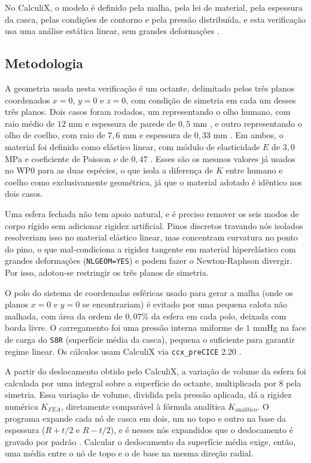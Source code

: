 No CalculiX, o modelo é definido pela malha, pela lei de material, pela espessura da casca, pelas condições de contorno e pela pressão distribuída, e esta verificação usa uma análise estática linear, sem grandes deformações \citep{dhondt2022manual}.
 
\subsection{Metodologia}
 
A geometria usada nesta verificação é um octante, delimitado pelos três planos coordenados $x=0$, $y=0$ e $z=0$, com condição de simetria em cada um desses três planos. Dois casos foram rodados, um representando o olho humano, com raio médio de $12$ mm \citep{moosajee2023} e espessura de parede de $0{,}5$ mm \citep{vurgese2012}, e outro representando o olho de coelho, com raio de $7{,}6$ mm \citep{bozkir1997, missel2012, lamminsalo2018} e espessura de $0{,}33$ mm \citep{missel2012, zhang2014cxl, lamminsalo2018}. Em ambos, o material foi definido como elástico linear, com módulo de elasticidade $E$ de $3{,}0$ MPa e coeficiente de Poisson $\nu$ de $0{,}47$ \citep{aloy2017vibrational}. Esses são os mesmos valores já usados no WP0 para as duas espécies, o que isola a diferença de $K$ entre humano e coelho como exclusivamente geométrica, já que o material adotado é idêntico nos dois casos.
 
Uma esfera fechada não tem apoio natural, e é preciso remover os seis modos de corpo rígido sem adicionar rigidez artificial. Pinos discretos travando nós isolados resolveriam isso no material elástico linear, mas concentram curvatura no ponto do pino, o que mal-condiciona a rigidez tangente em material hiperelástico com grandes deformações (\texttt{NLGEOM=YES}) e podem fazer o Newton-Raphson divergir. Por isso, adotou-se restringir os três planos de simetria.
 
O polo do sistema de coordenadas esféricas usado para gerar a malha (onde os planos $x=0$ e $y=0$ se encontrariam) é evitado por uma pequena calota não malhada, com área da ordem de $0{,}07\%$ da esfera em cada polo, deixada com borda livre. O carregamento foi uma pressão interna uniforme de $1$ mmHg na face de carga do \texttt{S8R} (superfície média da casca), pequena o suficiente para garantir regime linear. Os cálculos usam CalculiX \citep{dhondt2004finite} via \texttt{ccx\_preCICE} 2.20 \citep{dhondt2022manual}.
 
A partir do deslocamento obtido pelo CalculiX, a variação de volume da esfera foi calculada por uma integral sobre a superfície do octante, multiplicada por $8$ pela simetria. Essa variação de volume, dividida pela pressão aplicada, dá a rigidez numérica $K_{FEA}$, diretamente comparável à fórmula analítica $K_{\text{analítico}}$. O programa expande cada nó de casca em dois, um no topo e outro na base da espessura ($R+t/2$ e $R-t/2$), e é nesses nós expandidos que o deslocamento é gravado por padrão \citep{dhondt2022manual}. Calcular o deslocamento da superfície média exige, então, uma média entre o nó de topo e o de base na mesma direção radial.
 
